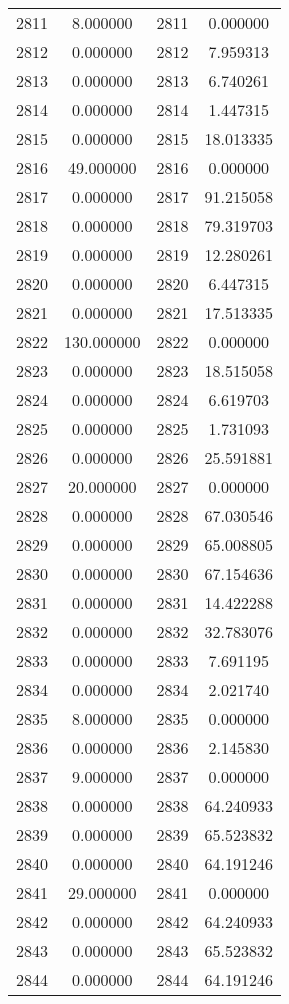 \documentclass[12pt]{article}
\begin{document}
\begin{longtable}{@{}cccc@{}}
2811 & 8.000000 & 2811 & 0.000000 \\
2812 & 0.000000 & 2812 & 7.959313 \\
2813 & 0.000000 & 2813 & 6.740261 \\
2814 & 0.000000 & 2814 & 1.447315 \\
2815 & 0.000000 & 2815 & 18.013335 \\
2816 & 49.000000 & 2816 & 0.000000 \\
2817 & 0.000000 & 2817 & 91.215058 \\
2818 & 0.000000 & 2818 & 79.319703 \\
2819 & 0.000000 & 2819 & 12.280261 \\
2820 & 0.000000 & 2820 & 6.447315 \\
2821 & 0.000000 & 2821 & 17.513335 \\
2822 & 130.000000 & 2822 & 0.000000 \\
2823 & 0.000000 & 2823 & 18.515058 \\
2824 & 0.000000 & 2824 & 6.619703 \\
2825 & 0.000000 & 2825 & 1.731093 \\
2826 & 0.000000 & 2826 & 25.591881 \\
2827 & 20.000000 & 2827 & 0.000000 \\
2828 & 0.000000 & 2828 & 67.030546 \\
2829 & 0.000000 & 2829 & 65.008805 \\
2830 & 0.000000 & 2830 & 67.154636 \\
2831 & 0.000000 & 2831 & 14.422288 \\
2832 & 0.000000 & 2832 & 32.783076 \\
2833 & 0.000000 & 2833 & 7.691195 \\
2834 & 0.000000 & 2834 & 2.021740 \\
2835 & 8.000000 & 2835 & 0.000000 \\
2836 & 0.000000 & 2836 & 2.145830 \\
2837 & 9.000000 & 2837 & 0.000000 \\
2838 & 0.000000 & 2838 & 64.240933 \\
2839 & 0.000000 & 2839 & 65.523832 \\
2840 & 0.000000 & 2840 & 64.191246 \\
2841 & 29.000000 & 2841 & 0.000000 \\
2842 & 0.000000 & 2842 & 64.240933 \\
2843 & 0.000000 & 2843 & 65.523832 \\
2844 & 0.000000 & 2844 & 64.191246 \\

\end{longtable}
\end{document}
